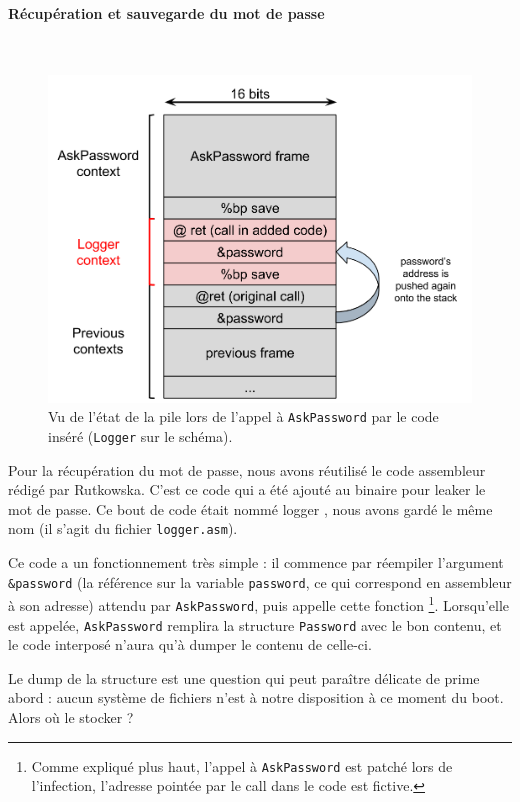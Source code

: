 \documentclass[12pt,a4paper]{article}
\begin{document}
\paragraph{Récupération et sauvegarde du mot de passe}~

\begin{figure}
    \centering
    \includegraphics[height=0.3\textheight]{img/pile_tc.png}
    \caption{Vu de l'état de la pile lors de l'appel à \texttt{AskPassword} par
             le code inséré (\texttt{Logger} sur le schéma).}
    \label{ask_tweak}
\end{figure}

Pour la récupération du mot de passe, nous avons réutilisé le code assembleur
rédigé par Rutkowska. C'est ce code qui a été ajouté au binaire pour
leaker le mot de passe. Ce bout de code était nommé \og logger \fg, nous
avons gardé le même nom (il s'agit du fichier \texttt{logger.asm}).

Ce code a un fonctionnement très simple : il commence par réempiler l'argument
\texttt{\&password} (la référence sur la variable \texttt{password}, ce qui
correspond en assembleur à son adresse) attendu par \texttt{AskPassword}, puis
appelle cette fonction \footnote{Comme expliqué plus haut, l'appel à
\texttt{AskPassword} est patché lors de l'infection, l'adresse pointée par le
call dans le code est fictive.}. Lorsqu'elle est appelée, \texttt{AskPassword}
remplira la structure \texttt{Password} avec le bon contenu, et le code interposé n'aura 
qu'à dumper le contenu de celle-ci.

Le dump de la structure est une question qui peut paraître délicate de prime
abord : aucun système de fichiers n'est à notre disposition à ce moment du boot.
Alors où le stocker ?
\end{document}
